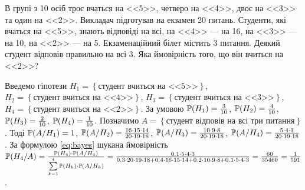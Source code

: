 \begin{example}
    В групі з 10 осіб троє вчаться на <<5>>, четверо на <<4>>, двоє на <<3>> та один на <<2>>.
    Викладач підготував на екзамен 20 питань. Студенти, які вчаться на <<5>>, знають відповіді на всі,
    на <<4>> --- на 16, на <<3>> --- на 10, на <<2>> --- на 5.
    Екзаменаційний білет містить 3 питання. Деякий студент відповів правильно на всі 3.
    Яка ймовірність того, що він вчиться на <<2>>?

    Введемо гіпотези $H_1 = \left\{ \text{студент вчиться на <<5>>}\right\}$, $H_2 = \left\{ \text{студент вчиться на <<4>>}\right\}$,
    $H_3 = \left\{ \text{студент вчиться на <<3>>}\right\}$, $H_4 = \left\{ \text{студент вчиться на <<2>>}\right\}$.
    За умовою $\P(H_1) = \frac{3}{10}$, $\P(H_2) = \frac{4}{10}$, $\P(H_3) = \frac{2}{10}$, $\P(H_4) = \frac{1}{10}$. 
    Позначимо $A = \left\{ \text{студент відповів на всі три питання}\right\}$. 
    Тоді $\P(A/H_1) = 1$, $\P(A/H_2) = \frac{16 \cdot 15 \cdot 14}{20 \cdot 19 \cdot 18}$, 
    $\P(A/H_3) = \frac{10 \cdot 9 \cdot 8}{20 \cdot 19 \cdot 18}$, 
    $\P(A/H_4) = \frac{5 \cdot 4 \cdot 3}{20 \cdot 19 \cdot 18}$.
    За формулою \eqref{eq:bayes} шукана ймовірність $\P(H_4/A) = \frac{\P(H_4) \cdot \P(A/H_4)}{\sum\limits_{k=1}^4 \P(H_k)\cdot \P(A/H_k)} =
    \frac{0.1 \cdot 5 \cdot 4 \cdot 3}{0.3 \cdot 20 \cdot 19 \cdot 18 + 0.4 \cdot 16 \cdot 15 \cdot 14 + 0.2 \cdot 10 \cdot 9 \cdot 8 + 0.1 \cdot 5 \cdot 4 \cdot 3}
     = \frac{60}{35460} = \frac{1}{591}$.

\end{example}